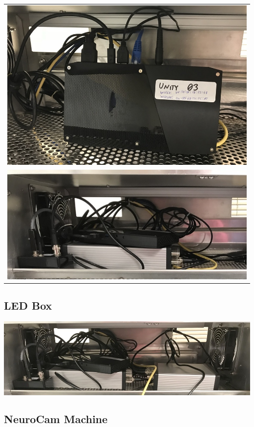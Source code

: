 \begin{center}
\begin{tabular}{c}
\includegraphics[width=0.6\columnwidth]
{photos/install-20181106/unity-wiring.jpg} \\
\includegraphics[width=0.8\columnwidth]
{photos/install-20181106/ard-unity-placement.jpg} \\
\end{tabular}
\end{center}

%
%
\clearpage
\subsection{LED Box}
\label{sect-setup-howto-ledbox}

\begin{center}
\includegraphics[width=0.9\columnwidth]
{photos/install-20181106/led-box.jpg}
\end{center}

%
%
\subsection{NeuroCam Machine}
\label{sect-setup-howto-neurocam}

